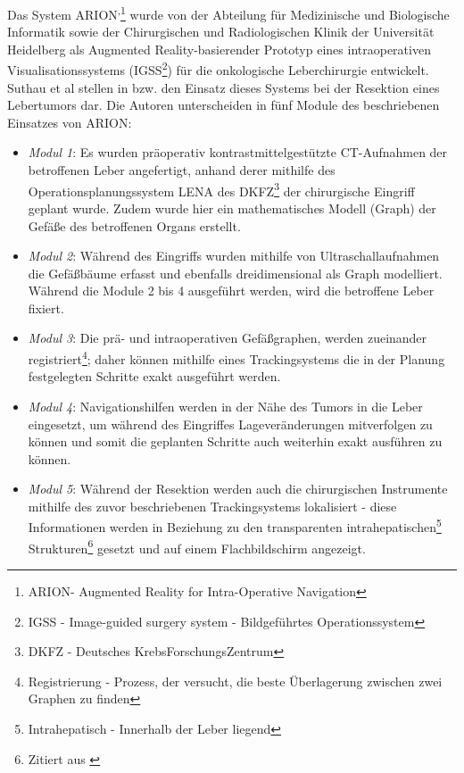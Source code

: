 \documentclass[pdftex,a4paper,titlepage,12pt]{scrartcl}
\newtheorem[L]{boxedDefinition}{Definition}
\begin{document}
Das System ARION\texttrademark\textsuperscript{,}\footnote{ARION\texttrademark - Augmented Reality for Intra-Operative Navigation} wurde von der Abteilung für Medizinische und Biologische Informatik sowie der Chirurgischen und Radiologischen Klinik der Universität Heidelberg als Augmented Reality-basierender Prototyp eines intraoperativen Visualisationssystems (IGSS\footnote{IGSS - Image-guided surgery system - Bildgeführtes Operationssystem}) für die onkologische Leberchirurgie entwickelt. Suthau et al stellen in \cite{Suthau2002DE} bzw. \cite{Suthau2002} den Einsatz dieses Systems bei der Resektion eines Lebertumors dar. Die Autoren unterscheiden in \cite{Suthau2002DE} fünf Module des beschriebenen Einsatzes von ARION\texttrademark:
\begin{itemize}
 \item \textit{Modul 1}: Es wurden präoperativ kontrastmittelgestützte CT-Aufnahmen der betroffenen Leber angefertigt, anhand derer mithilfe des Operationsplanungssystem LENA des DKFZ\footnote{DKFZ - Deutsches KrebsForschungsZentrum} der chirurgische Eingriff geplant wurde. Zudem wurde hier ein mathematisches Modell (Graph) der Gefäße des betroffenen Organs erstellt.
 \item \textit{Modul 2}: Während des Eingriffs wurden mithilfe von Ultraschallaufnahmen die Gefäßbäume erfasst und ebenfalls dreidimensional als Graph modelliert. Während die Module 2 bis 4 ausgeführt werden, wird die betroffene Leber fixiert.
 \item \textit{Modul 3}: Die prä- und intraoperativen Gefäßgraphen, werden 
zueinander registriert\footnote{Registrierung - Prozess, der versucht, die beste Überlagerung zwischen zwei Graphen zu finden}; daher können mithilfe eines Trackingsystems die in der Planung festgelegten Schritte exakt ausgeführt werden.
 \item \textit{Modul 4}: Navigationshilfen werden in der Nähe des Tumors in die Leber eingesetzt, um während des Eingriffes Lageveränderungen mitverfolgen zu können und somit die geplanten Schritte auch weiterhin exakt ausführen zu können.
 \item \textit{Modul 5}: Während der Resektion werden auch die chirurgischen Instrumente mithilfe des zuvor beschriebenen Trackingsystems lokalisiert - diese Informationen werden \glqq in Beziehung zu den transparenten intrahepatischen\footnote{Intrahepatisch - Innerhalb der Leber liegend} Strukturen\grqq\footnote{Zitiert aus \cite[Kapitel 2, Seite 3]{Suthau2002DE}} gesetzt und auf einem Flachbildschirm angezeigt.
\end{itemize}
\end{document}
